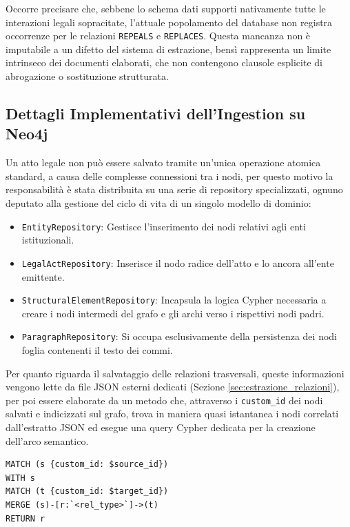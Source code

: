 Occorre precisare che, sebbene lo schema dati supporti nativamente tutte le interazioni legali sopracitate, l'attuale popolamento del database non registra occorrenze per le relazioni \texttt{REPEALS} e \texttt{REPLACES}. Questa mancanza non è imputabile a un difetto del sistema di estrazione, bensì rappresenta un limite intrinseco dei documenti elaborati, che non contengono clausole esplicite di abrogazione o sostituzione strutturata.

\subsection{Dettagli Implementativi dell'Ingestion su Neo4j}
Un atto legale non può essere salvato tramite un'unica operazione atomica standard, a causa delle complesse connessioni tra i nodi, per questo motivo la responsabilità è stata distribuita su una serie di repository specializzati, ognuno deputato alla gestione del ciclo di vita di un singolo modello di dominio:
\begin{itemize}
    \item \texttt{EntityRepository}: Gestisce l'inserimento dei nodi relativi agli enti istituzionali.
    \item \texttt{LegalActRepository}: Inserisce il nodo radice dell'atto e lo ancora all'ente emittente.
    \item \texttt{StructuralElementRepository}: Incapsula la logica Cypher necessaria a creare i nodi intermedi del grafo e gli archi verso i rispettivi nodi padri.
    \item \texttt{ParagraphRepository}: Si occupa esclusivamente della persistenza dei nodi foglia contenenti il testo dei commi.
\end{itemize}

Per quanto riguarda il salvataggio delle relazioni trasversali, queste informazioni vengono lette da file JSON esterni dedicati (Sezione \ref{sec:estrazione_relazioni}), per poi essere elaborate da un metodo che, attraverso i \texttt{custom\_id} dei nodi salvati e indicizzati sul grafo, trova in maniera quasi istantanea i nodi correlati dall'estratto JSON ed esegue una query Cypher dedicata per la creazione dell'arco semantico.

\begin{lstlisting}[language=Cypher, caption={Query Cypher per l'inserimento delle relazioni legali}, label={lst:cypher_relationships}]
MATCH (s {custom_id: $source_id})
WITH s
MATCH (t {custom_id: $target_id})
MERGE (s)-[r:`<rel_type>`]->(t)
RETURN r
\end{lstlisting}

